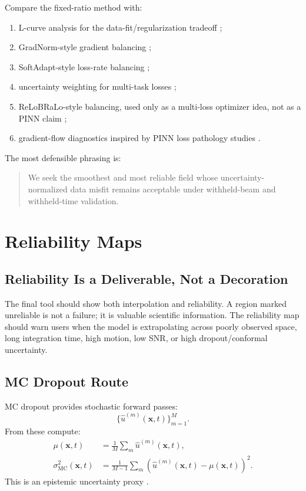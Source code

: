 \documentclass[11pt]{article}
\begin{document}
Compare the fixed-ratio method with:
\begin{enumerate}[leftmargin=*]
  \item L-curve analysis for the data-fit/regularization tradeoff
  \cite{Hansen1992LCurve};
  \item GradNorm-style gradient balancing \cite{Chen2018GradNorm};
  \item SoftAdapt-style loss-rate balancing \cite{Heydari2019SoftAdapt};
  \item uncertainty weighting for multi-task losses \cite{Kendall2018MultiTask};
  \item ReLoBRaLo-style balancing, used only as a multi-loss optimizer idea, not as a PINN
  claim \cite{Bischof2021ReLoBRaLo};
  \item gradient-flow diagnostics inspired by PINN loss pathology studies
  \cite{Wang2021GradientPathologies}.
\end{enumerate}

The most defensible phrasing is:
\begin{quote}
We seek the smoothest and most reliable field whose uncertainty-normalized data misfit remains
acceptable under withheld-beam and withheld-time validation.
\end{quote}

\section{Reliability Maps}

\subsection{Reliability Is a Deliverable, Not a Decoration}

The final tool should show both interpolation and reliability. A region marked unreliable is not a
failure; it is valuable scientific information. The reliability map should warn users when the model
is extrapolating across poorly observed space, long integration time, high motion, low SNR, or high
dropout/conformal uncertainty.

\subsection{MC Dropout Route}

MC dropout provides stochastic forward passes:
\begin{equation}
  \{\hat{u}^{(m)}(\mathbf{x},t)\}_{m=1}^{M}.
\end{equation}
From these compute:
\begin{align}
  \mu(\mathbf{x},t) &= \frac{1}{M}\sum_m \hat{u}^{(m)}(\mathbf{x},t),\\
  \sigma_{\mathrm{MC}}^2(\mathbf{x},t)
  &=
  \frac{1}{M-1}\sum_m
  \left(\hat{u}^{(m)}(\mathbf{x},t)-\mu(\mathbf{x},t)\right)^2.
\end{align}
This is an epistemic uncertainty proxy \cite{Gal2016Dropout,KendallGal2017}.
\end{document}
